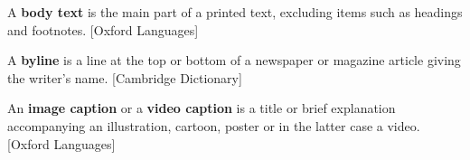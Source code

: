\documentclass[oneside, english, bibtex]{kththesis}
\begin{document}
\begin{definition}
\label{body text}
A \textbf{body text} is the main part of a printed text, excluding items such as headings and footnotes. [Oxford Languages]
\end{definition}

\begin{definition}
\label{byline}
A \textbf{byline} is a line at the top or bottom of a newspaper or magazine article giving the writer's name. [Cambridge Dictionary]
\end{definition}

\begin{definition}
\label{img}
An \textbf{image caption} or a \textbf{video caption} is a title or brief explanation accompanying an illustration, cartoon, poster or in the latter case a video. [Oxford Languages]
\end{definition}

\label{pg:lastPageofMainmatter}

\clearpage
\fancyhead{}  %
\end{document}
